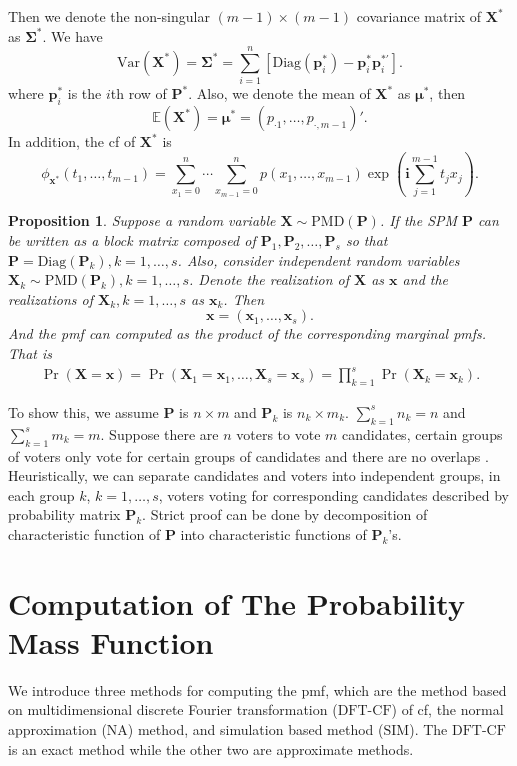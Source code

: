 \documentclass[12pt]{article}
\newcommand{\Sigmavec}{{\boldsymbol{\Sigma}}}
\newcommand{\EE}{\mathbb{E}}
\newcommand{\Pmat}{\mathbf{P}}
\newcommand{\pvec}{\boldsymbol{p}}
\newcommand{\Var}{{\textrm{Var}}}
\newcommand{\ivec}{{\boldsymbol{i}}}
\newcommand{\diag}{\textrm{Diag}}
\newcommand{\PMD}{\textrm{PMD}}
\newcommand{\Xvec}{\boldsymbol{X}}
\newcommand{\xvec}{\boldsymbol{x}}
\newcommand{\muvec}{\boldsymbol{\mu}}
\newcommand{\Sig}{\boldsymbol{\Sigma}}
\newcommand{\SIM}{{\textrm{SIM}}}
\newcommand{\NA}{{\textrm{NA}}}
\newcommand{\dft}{{\textrm{DFT-CF}}}
\newcommand{\qedw}{\hfill \ensuremath{\Box}}
\newtheorem{ppt}{Proposition}
\begin{document}
Then we denote the non-singular $(m-1) \times (m-1)$ covariance matrix of $\Xvec^{\ast}$ as $\Sigmavec^{\ast}$. We have
 $$\Var(\Xvec^{\ast}) =\Sig^{\ast}=\sum_{i=1}^n[\diag(\pvec_i^{\ast})-\pvec_i^{\ast} \pvec_i^{\ast \prime} ].$$
where $\pvec_i^{\ast}$ is the $i$th row of $\Pmat^{\ast}$. Also, we denote the mean of $\Xvec^{\ast}$ as $\muvec^{\ast}$, then
  $$\EE(\Xvec^{\ast}) =\muvec^{\ast} = \left( p_{\cdot1} ,\dots,p_{\cdot,m-1}\right)'.$$
 In addition, the cf of $\Xvec^{\ast}$ is
 \begin{equation*}
\phi_{\xvec^{\ast}}(t_1, \dots, t_{m-1})  =  \sum_{x_1 = 0}^{n} \cdots \sum_{x_{m-1} = 0}^n p(x_1,\ldots,x_{m-1})\exp\left(\ivec\sum_{j=1}^{m-1}t_jx_j\right).
\end{equation*}

\begin{ppt}%
Suppose a random variable $\Xvec \sim \PMD(\Pmat)$. If the SPM $\Pmat$ can be written as a block matrix composed of $\Pmat_1, \Pmat_2, \dots, \Pmat_{s}$ so that $\Pmat = \diag(\Pmat_{k}), k=1,\dots,s$. Also, consider independent random variables $\Xvec_{k} \sim \PMD(\Pmat_{k}), k=1,\dots,s$. Denote the realization of $\Xvec$ as $\xvec$ and the realizations of $\Xvec_{k}, k=1,\dots,s$ as $\xvec_k$. Then
$$\xvec= (\xvec_{1},\dots,\xvec_{s}).$$
And the pmf can computed as the product of the corresponding marginal pmfs. That is
\begin{align*}
\Pr(\Xvec=\xvec)= \Pr(\Xvec_{1}=\xvec_{1}, \dots, \Xvec_{s}=\xvec_{s})= \prod_{k=1}^s \Pr(\Xvec_{k} = \xvec_{k}).
\end{align*}
\end{ppt}

To show this, we assume $\Pmat$ is $n \times m$ and $\Pmat_{k}$ is $n_k \times m_k$. $\sum_{k=1}^s n_k = n$ and $\sum_{k=1}^s m_k = m$. Suppose there are $n$ voters to vote $m$ candidates, certain groups of voters only vote for certain groups of candidates and there are no overlaps . Heuristically, we can separate candidates and voters into independent groups, in each group $k$, $k = 1,\dots,s$, voters voting for corresponding candidates described by probability matrix $\Pmat_{k}$. Strict proof can be done by decomposition of characteristic function of $\Pmat$ into characteristic functions of $\Pmat_{k}$'s.



\section{Computation of The Probability Mass Function} \label{sec:CA.driving.study}
We introduce three methods for computing the pmf, which are the method based on multidimensional discrete Fourier transformation ($\dft$) of cf, the normal approximation ($\NA$) method, and simulation based method ($\SIM$). The $\dft$ is an exact method while the other two are approximate methods.
\end{document}

